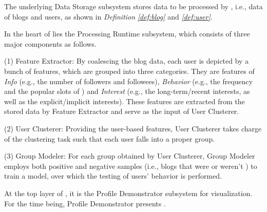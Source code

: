  The underlying Data Storage subsystem stores data to be processed by \sys{}, i.e., data of blogs and users, as shown in \textit{Definition} \textit{\ref{def:blog}} and \textit{\ref{def:user}}.

In the heart of \sys{} lies the Processing Runtime subsystem, which consists of three major components as follows.

	\stab(1)  Feature Extractor: By coalescing the blog data, each user is depicted by a bunch of features, which are grouped into three categories. They are features of \textit{Info} (e.g., the number of followers and followees), \textit{Behavior} (e.g., the frequency and the popular slots of \retg{}) and \textit{Interest} (e.g., the long-term/recent interests, as well as the explicit/implicit interests). These features are extracted from the stored data by Feature Extractor and serve as the input of User Clusterer.
	
	\stab(2)  User Clusterer: Providing the user-based features, User Clusterer takes charge of the clustering task such that each user falls into a proper group.
	
	\stab(3)  Group Modeler: For each group obtained by User Clusterer, Group Modeler employs both positive and negative samples (i.e., blogs that were or weren't \retd{}) to train a model, over which the testing of users' \retg{} behavior is performed.
	
 At the top layer of \sys{}, it is the Profile Demonstrator subsystem for visualization.
For the time being, Profile Demonstrator presents \tbc{}.



